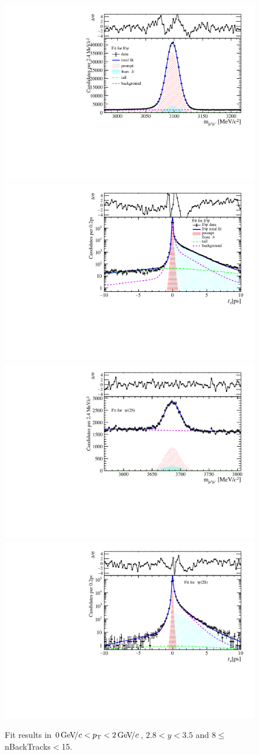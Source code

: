 \begin{figure}[H]
\begin{center}
\includegraphics[width=0.47\linewidth]{pdf/Jpsi/drawmassB/n2y2pt1.pdf}
\includegraphics[width=0.47\linewidth]{pdf/Jpsi/2DFitB/n2y2pt1.pdf}
\vspace*{-0.5cm}
\includegraphics[width=0.47\linewidth]{pdf/Psi2S/drawmassB/n2y2pt1.pdf}
\includegraphics[width=0.47\linewidth]{pdf/Psi2S/2DFitB/n2y2pt1.pdf}
\vspace*{-0.5cm}
\end{center}
\caption{Fit results in $0\text{\,Ge\kern -0.1em V\!/}c<p_{\mathrm{T}}<2\text{\,Ge\kern -0.1em V\!/}c$, $2.8<y<3.5$ and 8$\leq$nBackTracks$<$15.}
\label{Fitn2y2pt1}
\end{figure}
